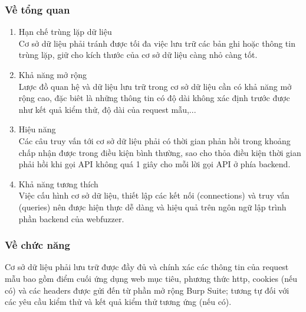 \subsubsection{Về tổng quan}
\begin{enumerate}
    \item Hạn chế trùng lặp dữ liệu\\
    Cơ sở dữ liệu phải tránh được tối đa việc lưu trữ các bản ghi hoặc thông tin trùng lặp, giữ cho kích thước của cơ sở dữ liệu càng nhỏ càng tốt.
    \item Khả năng mở rộng\\
    Lược đồ quan hệ và dữ liệu lưu trữ trong cơ sở dữ liệu cần có khả năng mở rộng cao, đặc biêt là những thông tin có độ dài không xác định trước được như kết quả kiểm thử, độ dài của request mẫu,...
    \item Hiệu năng\\
    Các câu truy vấn tới cơ sở dữ liệu phải có thời gian phản hồi trong khoảng chấp nhận được trong điều kiện bình thường, sao cho thỏa điều kiện thời gian phải hồi khi gọi API không quá 1 giây cho mỗi lời gọi API ở phía backend.
    \item Khả năng tương thích\\
    Việc cấu hình cơ sở dữ liệu, thiết lập các kết nối (connections) và truy vấn (queries) nên được hiện thực dễ dàng và hiệu quả trên ngôn ngữ lập trình phần backend của webfuzzer.
\end{enumerate}
\subsubsection{Về chức năng}
Cơ sở dữ liệu phải lưu trữ được đầy đủ và chính xác các thông tin của request mẫu bao gồm điểm cuối ứng dụng web mục tiêu, phương thức \acrshort{http}, cookies (nếu có) và các headers được gửi đến từ phần mở rộng Burp Suite; tương tự đối với các yêu cầu kiểm thử và kết quả kiểm thử tương ứng (nếu có).
